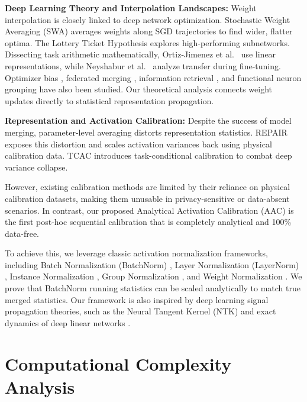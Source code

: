 \documentclass{article}
\theoremstyle{plain}
\theoremstyle{definition}
\theoremstyle{remark}
\begin{document}
\textbf{Deep Learning Theory and Interpolation Landscapes:} Weight interpolation is closely linked to deep network optimization. Stochastic Weight Averaging (SWA) \cite{izmailov2018averaging} averages weights along SGD trajectories to find wider, flatter optima. The Lottery Ticket Hypothesis \cite{frankle2019lottery} explores high-performing subnetworks. Dissecting task arithmetic mathematically, Ortiz-Jimenez et al.\ \cite{ortiz2023task} use linear representations, while Neyshabur et al.\ \cite{neyshabur2020what} analyze transfer during fine-tuning. Optimizer bias \cite{zhang2025implicit}, federated merging \cite{chen2024local}, information retrieval \cite{sasaki2025effect}, and functional neuron grouping \cite{gu2025neuronmerge} have also been studied. Our theoretical analysis connects weight updates directly to statistical representation propagation.

\textbf{Representation and Activation Calibration:} Despite the success of model merging, parameter-level averaging distorts representation statistics. REPAIR \cite{jordan2022repair} exposes this distortion and scales activation variances back using physical calibration data. TCAC \cite{submission5} introduces task-conditional calibration to combat deep variance collapse.

However, existing calibration methods are limited by their reliance on physical calibration datasets, making them unusable in privacy-sensitive or data-absent scenarios. In contrast, our proposed Analytical Activation Calibration (AAC) is the first post-hoc sequential calibration that is completely analytical and 100\% data-free.

To achieve this, we leverage classic activation normalization frameworks, including Batch Normalization (BatchNorm) \cite{ioffe2015batch}, Layer Normalization (LayerNorm) \cite{ba2016layer}, Instance Normalization \cite{ulyanov2016instance}, Group Normalization \cite{wu2018group}, and Weight Normalization \cite{salimans2016weight}. We prove that BatchNorm running statistics can be scaled analytically to match true merged statistics. Our framework is also inspired by deep learning signal propagation theories, such as the Neural Tangent Kernel (NTK) \cite{jacot2018neural} and exact dynamics of deep linear networks \cite{saxe2013exact}.

\section{Computational Complexity Analysis}
\label{sec:complexity}
\end{document}

